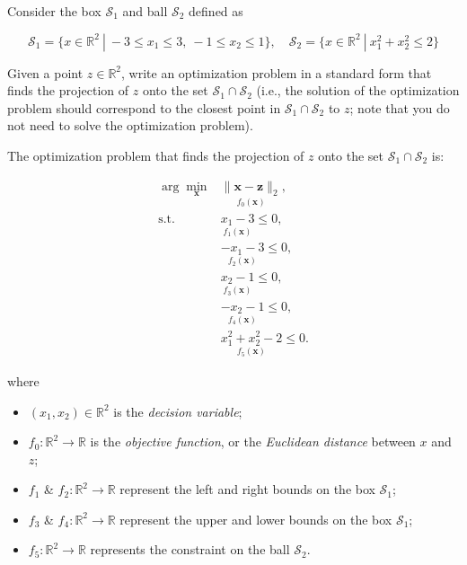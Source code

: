 \begin{homeworkProblem}

Consider the box $\mathcal S_1$ and ball $\mathcal S_2$ defined as

\begin{equation}
    \mathcal S_1=\{x\in\mathbb R^2 \ |\ -3\leq x_1\leq 3,\ -1\leq x_2\leq 1\},
    \quad \mathcal S_2=\{x\in\mathbb R^2 \ |\  x_1^2+x_2^2\leq 2\}
\end{equation}

Given a point $z\in\mathbb R^2$, write an optimization problem in a standard 
form that finds the projection of $z$ onto the set $\mathcal S_1\cap \mathcal S_2$ 
(i.e., the solution of the optimization problem should correspond to the closest 
point in $\mathcal S_1\cap \mathcal S_2$ to $z$; note that you do not need to 
solve the optimization problem). \\

\begin{solution}

    The optimization problem that finds the projection of $z$ onto the set
    $\mathcal S_1 \cap \mathcal S_2$ is:

    \[
        \begin{array}{rl}
            \arg\min\limits_{\boldsymbol{x}} & \underset{f_0(\boldsymbol{x})}
            {\boxed{\|\boldsymbol{x}-\boldsymbol{z}\|_2}}, \\ [3ex]
            \text{s.t.} & \underset{f_1(\boldsymbol{x})}{\boxed{x_1 - 3}} \leq 0, \\ [3ex]
                        & \underset{f_2(\boldsymbol{x})}{\boxed{-x_1 - 3}} \leq 0, \\ [3ex]
                        & \underset{f_3(\boldsymbol{x})}{\boxed{x_2 - 1}} \leq 0, \\ [3ex]
                        & \underset{f_4(\boldsymbol{x})}{\boxed{-x_2 - 1}} \leq 0, \\ [3ex]
                        & \underset{f_5(\boldsymbol{x})}{\boxed{x_1^2 + x_2^2 - 2}} \leq 0.
        \end{array}
    \]

    where
    \begin{itemize}
        \item $(x_1, x_2) \in \mathbb{R}^2$ is the \textit{decision variable};
        \item $f_0 : \mathbb{R}^2 \to \mathbb{R}$ is the \textit{objective function}, 
        or the \textit{Euclidean distance} between $x$ and $z$;
        \item $f_1$ \& $f_2 : \mathbb{R}^2 \to \mathbb{R}$ represent the left and 
        right bounds on the box $\mathcal{S}_1$;
        \item $f_3$ \& $f_4 : \mathbb{R}^2 \to \mathbb{R}$ represent the upper and 
        lower bounds on the box $\mathcal{S}_1$;
        \item $f_5 : \mathbb{R}^2 \to \mathbb{R}$ represents the constraint on the 
        ball $\mathcal{S}_2$.
    \end{itemize}

\end{solution}

\end{homeworkProblem}